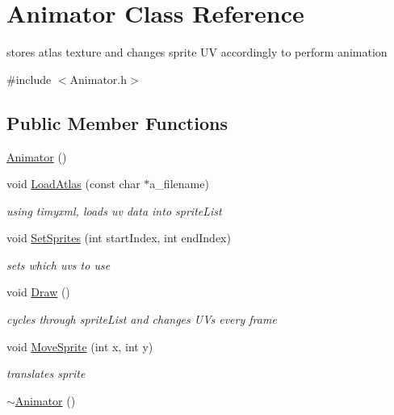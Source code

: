\hypertarget{class_animator}{}\section{Animator Class Reference}
\label{class_animator}


stores atlas texture and changes sprite U\+V accordingly to perform animation  




{\ttfamily \#include $<$Animator.\+h$>$}

\subsection*{Public Member Functions}
\begin{DoxyCompactItemize}
\item 
\hyperlink{class_animator_a701eeb9283612be2027425efb06bbff7}{Animator} ()
\item 
void \hyperlink{class_animator_a1fd520da6c552fab7ad81c4afd7146dd}{Load\+Atlas} (const char $\ast$a\+\_\+filename)
\begin{DoxyCompactList}\small\item\em using timyxml, loads uv data into sprite\+List \end{DoxyCompactList}\item 
void \hyperlink{class_animator_a6f3e136260dea0f094bf427ce375f52a}{Set\+Sprites} (int start\+Index, int end\+Index)
\begin{DoxyCompactList}\small\item\em sets which uvs to use \end{DoxyCompactList}\item 
void \hyperlink{class_animator_a39649c4a3f71cf863157e66425f0ff3f}{Draw} ()
\begin{DoxyCompactList}\small\item\em cycles through sprite\+List and changes U\+Vs every frame \end{DoxyCompactList}\item 
void \hyperlink{class_animator_aca02a9659e77a9094c65315546fbdb4b}{Move\+Sprite} (int x, int y)
\begin{DoxyCompactList}\small\item\em translates sprite \end{DoxyCompactList}\item 
\hyperlink{class_animator_a5af4797549f9f466a88657899e17c6ab}{$\sim$\+Animator} ()
\end{DoxyCompactItemize}
